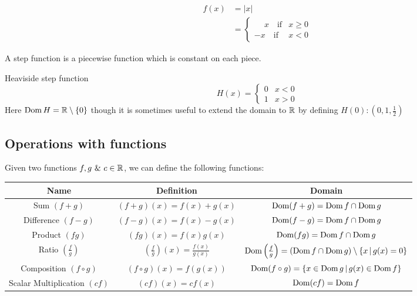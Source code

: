 \documentclass[10pt, a4paper]{article}
\begin{document}
\begin{example}
    \begin{align*}
        f(x) &= |x| \\
        &= \begin{cases}
            \phantom{-}x\quad \text{if} &x \geq 0 \\
            -x\quad \text{if} &x < 0
        \end{cases}
    \end{align*}
\end{example}

A step function is a piecewise function which is constant on each piece.
\begin{example}
    Heaviside step function
    \[
    H(x) = \begin{cases}
        0 & x < 0 \\
        1 & x > 0
    \end{cases}
    \]
    Here $\operatorname{Dom} H = \mathbb{R} \setminus \{0\}$ though it is sometimes useful to extend the domain to $\mathbb{R}$ by defining $H(0): (0, 1, \frac{1}{2})$
\end{example}

\subsection{Operations with functions}
Given two functions $f, g\  \&\  c \in \mathbb{R}$, we can define the following functions:
\begin{table}[H]
    \centering
    \begin{tabular}{|c|c|c|}
        \hline
        Name & Definition & Domain \\
        \hline
        Sum $(f + g)$ & $(f + g)(x) = f(x) + g(x)$ & $\operatorname{Dom} (f + g) = \operatorname{Dom} f \cap \operatorname{Dom} g$ \\
        Difference $(f - g)$ & $(f - g)(x) = f(x) - g(x)$ & $\operatorname{Dom} (f - g) = \operatorname{Dom} f \cap \operatorname{Dom} g$ \\
        Product $(fg)$ & $(fg)(x) = f(x)g(x)$ & $\operatorname{Dom} (fg) = \operatorname{Dom} f \cap \operatorname{Dom} g$ \\
        Ratio $\left(\frac{f}{g}\right)$ & $\left(\frac{f}{g}\right)(x) = \frac{f(x)}{g(x)}$ & $\operatorname{Dom} \left(\frac{f}{g}\right) = (\operatorname{Dom} f \cap \operatorname{Dom} g) \setminus \{x\,|\,g(x) = 0\}$ \\
        Composition $(f\circ g)$ & $(f \circ g)(x) = f(g(x))$ & $\operatorname{Dom} (f \circ g) = \{x \in \operatorname{Dom} g\,|\, g(x) \in \operatorname{Dom} f\}$ \\
        Scalar Multiplication $(cf)$ & $(cf)(x) = cf(x)$ & $\operatorname{Dom} (cf) = \operatorname{Dom} f$ \\
        \hline
    \end{tabular}
\end{table}
\end{document}

